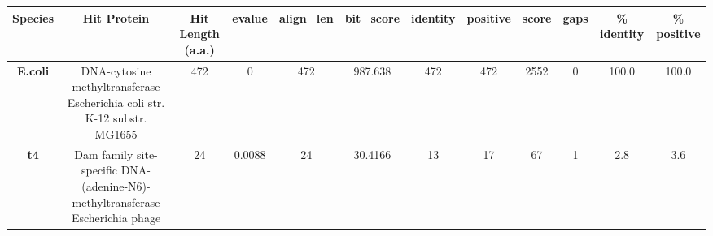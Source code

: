 \begin{tabular}{|c|c|c|c|c|c|c|c|c|c|c|c|} \hline
\textbf{Species} & \textbf{Hit Protein} & \textbf{Hit Length (a.a.)} & \textbf{evalue} & \textbf{align\_len} & \textbf{bit\_score} & \textbf{identity} & \textbf{positive} & \textbf{score} & \textbf{gaps} & \textbf{\% identity} & \textbf{\% positive} \\ \hline
\textbf{E.coli} & DNA-cytosine methyltransferase Escherichia coli str. K-12 substr. MG1655 & 472 & 0 & 472 & 987.638 & 472 & 472 & 2552 & 0 & 100.0 & 100.0\\
\textbf{t4} & Dam family site-specific DNA-(adenine-N6)-methyltransferase Escherichia phage  & 24 & 0.0088 & 24 & 30.4166 & 13 & 17 & 67 & 1 & 2.8 & 3.6\\
\hline \end{tabular}
